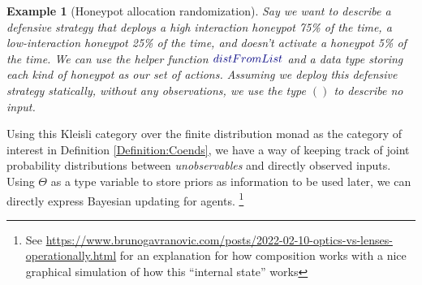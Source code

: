 \documentclass[11pt,titlepage,dvipsnames,table,xcdraw,english]{article}
\newcommand{\Conid}[1]{\mathit{#1}}
\newcommand{\Varid}[1]{\mathit{#1}}
\def\resethooks{%
  \global\let\SaveRestoreHook\empty
  \global\let\ColumnHook\empty}
\newcommand{\hsindent}[1]{\quad}%
\let\hspre\empty
\let\hspost\empty
\renewcommand{\Conid}[1]{{\color{funcColor}{#1}}}
\renewcommand{\Varid}[1]{{\color{typeColor}{#1}}}
\newtheorem{example}{Example}
\begin{document}
\begin{mdframed}
\begin{example}[Honeypot allocation randomization]
Say we want to describe a defensive strategy that deploys a high interaction honeypot 75\% of the time, a low-interaction honeypot 25\% of the time, and doesn't activate a honeypot 5\% of the time. We can use the helper function \ensuremath{\Varid{distFromList}} and a data type storing each kind of honeypot as our set of actions. Assuming we deploy this defensive strategy statically, without any observations, we use the type \ensuremath{()} to describe no input.

\resethooks

\end{example}
\end{mdframed}


Using this Kleisli category over the finite distribution monad as the category of interest in Definition \ref{Definition:Coends}, we have a way of keeping track of 
joint probability distributions between \textit{unobservables} and directly observed inputs. 
Using $\Theta$ as a type variable to 
store priors as information to be used later, we can directly express Bayesian updating for agents. \footnote{See \href{Bruno Gavaranovic's blog post}{https://www.brunogavranovic.com/posts/2022-02-10-optics-vs-lenses-operationally.html} for an explanation for how composition works with a nice graphical simulation of how this ``internal state'' works} 
\end{document}
